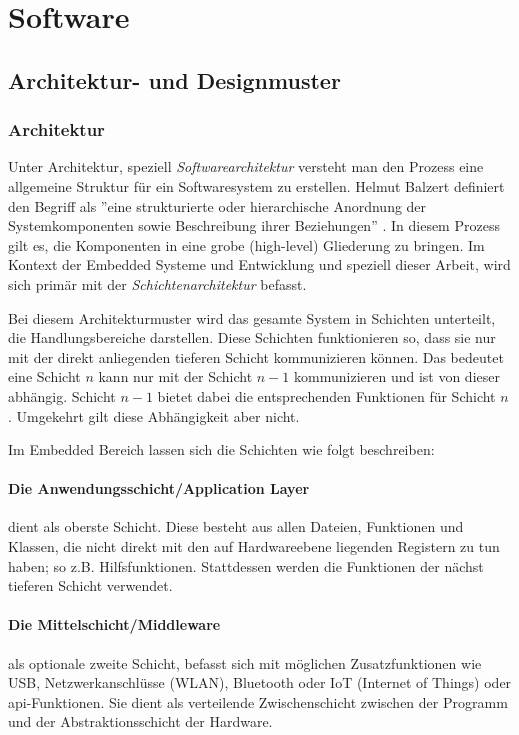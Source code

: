 \section{Software}

\subsection{Architektur- und Designmuster}
\subsubsection{Architektur}
Unter Architektur, speziell \emph{Softwarearchitektur} versteht man den Prozess eine allgemeine Struktur für ein Softwaresystem zu erstellen.
Helmut Balzert definiert den Begriff als ''eine strukturierte oder hierarchische Anordnung der Systemkomponenten sowie Beschreibung ihrer Beziehungen'' \cite{balzert2011softwaretechnik2}.
In diesem Prozess gilt es, die Komponenten in eine grobe (high-level) Gliederung zu bringen.
Im Kontext der Embedded Systeme und Entwicklung und speziell dieser Arbeit, wird sich primär mit der \emph{Schichtenarchitektur} befasst.

Bei diesem Architekturmuster wird das gesamte System in Schichten unterteilt, die  Handlungsbereiche darstellen.
Diese Schichten funktionieren so, dass sie nur mit der direkt anliegenden tieferen Schicht kommunizieren können.
Das bedeutet eine Schicht $n$ kann nur mit der Schicht $n-1$ kommunizieren und ist von dieser abhängig.
Schicht $n-1$ bietet dabei die entsprechenden Funktionen für Schicht $n$.
Umgekehrt gilt diese Abhängigkeit aber nicht.

Im Embedded Bereich lassen sich die Schichten wie folgt beschreiben:

\paragraph{Die Anwendungsschicht/Application Layer}
dient als oberste Schicht.
Diese besteht aus allen Dateien, Funktionen und Klassen, die nicht direkt mit den auf Hardwareebene liegenden Registern zu tun haben; so z.B. Hilfsfunktionen.
Stattdessen werden die Funktionen der nächst tieferen Schicht verwendet.

\paragraph{Die Mittelschicht/Middleware}
als optionale zweite Schicht, befasst sich mit möglichen Zusatzfunktionen wie USB, Netzwerkanschlüsse (WLAN), Bluetooth oder IoT (Internet of Things) oder \gls{api}-Funktionen.
Sie dient als verteilende Zwischenschicht zwischen der Programm und der Abstraktionsschicht der Hardware.

